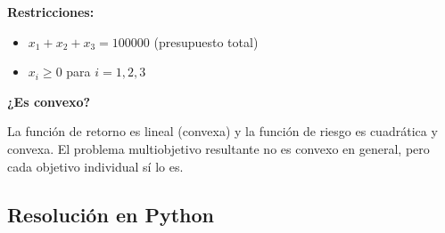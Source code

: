 \documentclass[12pt]{article}
\begin{document}
\textbf{Restricciones:}
\begin{itemize}
    \item $x_1 + x_2 + x_3 = 100000$ (presupuesto total)
    \item $x_i \geq 0$ para $i = 1, 2, 3$
\end{itemize}

\vspace{0.3em}

\textbf{¿Es convexo?}

\vspace{0.3em}

La función de retorno es lineal (convexa) y la función de riesgo es cuadrática y convexa. El problema multiobjetivo resultante no es convexo en general, pero cada objetivo individual sí lo es.

\subsection{Resolución en Python}
\end{document}
